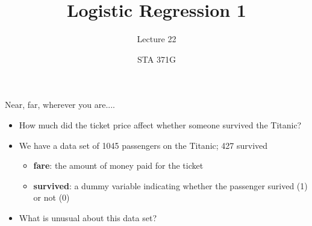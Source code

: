 \documentclass{beamer}\usepackage[]{graphicx}\usepackage[]{color}
\title{Logistic Regression 1}
\subtitle{Lecture 22}
\author{STA 371G}
\makeatletter
\newcommand{\hlopt}[1]{\textcolor[rgb]{1,0.894,0.769}{#1}}%
\newcommand{\hlstd}[1]{\textcolor[rgb]{1,0.894,0.769}{#1}}%
\newcommand{\hlkwb}[1]{\textcolor[rgb]{0.804,0.776,0.451}{#1}}%
\newcommand{\hlkwc}[1]{\textcolor[rgb]{0.78,0.941,0.545}{#1}}%
\newcommand{\hlkwd}[1]{\textcolor[rgb]{1,0.78,0.769}{#1}}%
\newenvironment{kframe}{%
 \def\at@end@of@kframe{}%
 \ifinner\ifhmode%
  \def\at@end@of@kframe{\end{minipage}}%
  \begin{minipage}{\columnwidth}%
 \fi\fi%
 \def\FrameCommand##1{\hskip\@totalleftmargin \hskip-\fboxsep
 \colorbox{shadecolor}{##1}\hskip-\fboxsep
     \hskip-\linewidth \hskip-\@totalleftmargin \hskip\columnwidth}%
 \MakeFramed {\advance\hsize-\width
   \@totalleftmargin\z@ \linewidth\hsize
   \@setminipage}}%
 {\par\unskip\endMakeFramed%
 \at@end@of@kframe}
\newenvironment{knitrout}{}{} %
\makeatother
\begin{document}
  
  

  \frame{\maketitle}



  \begin{darkframes}
    \begin{frame}{Near, far, wherever you are....}
      \begin{itemize}
        \item How much did the ticket price affect whether someone survived the Titanic?
        \item We have a data set of 1045 passengers on the Titanic; 427 survived
          \begin{itemize}
            \item \textbf{fare}: the amount of money paid for the ticket
            \item \textbf{survived}: a dummy variable indicating whether the passenger surived (1) or not (0)
          \end{itemize}
        \pause
        \item What is unusual about this data set?
      \end{itemize}
    \end{frame}



\end{darkframes}
\end{document}
